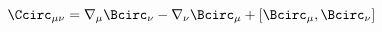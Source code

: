 \begin{equation}
\label{e5:41}
\Ccirc_{\mu \nu} = \nabla_{\mu} \Bcirc_{\nu} -\nabla_{\nu} \Bcirc_{\mu} +[\Bcirc_{\mu},\Bcirc_{\nu}]
\end{equation}

